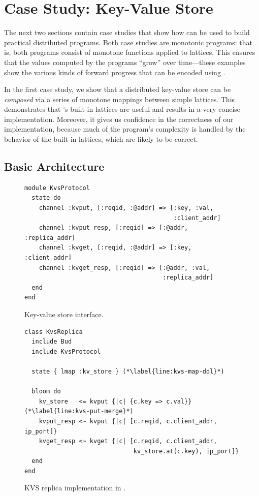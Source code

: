 \section{Case Study: Key-Value Store}
\label{sec:kvs}
The next two sections contain case studies that show how \lang can be used to
build practical distributed programs. Both case studies are monotonic programs:
that is, both programs consist of monotone functions applied to lattices. This
ensures that the values computed by the programs ``grow'' over time---these
examples show the various kinds of forward progress that can be encoded using
\lang.

In the first case study, we show that a distributed key-value store can be
\emph{composed} via a series of monotone mappings between simple lattices. This
demonstrates that \lang's built-in lattices are useful and results in a very
concise implementation. Moreover, it gives us confidence in the correctness of
our implementation, because much of the program's complexity is handled by the
behavior of the built-in lattices, which are likely to be correct.

\subsection{Basic Architecture}
\begin{figure}[t]
\begin{scriptsize}
\begin{lstlisting}
module KvsProtocol
  state do
    channel :kvput, [:reqid, :@addr] => [:key, :val,
                                         :client_addr]
    channel :kvput_resp, [:reqid] => [:@addr, :replica_addr]
    channel :kvget, [:reqid, :@addr] => [:key, :client_addr]
    channel :kvget_resp, [:reqid] => [:@addr, :val,
                                      :replica_addr]
  end
end
\end{lstlisting}
\end{scriptsize}
\caption{Key-value store interface.}
\label{fig:kvs-interface}
\end{figure}

\begin{figure}[t]
\begin{scriptsize}
\begin{lstlisting}
class KvsReplica
  include Bud
  include KvsProtocol

  state { lmap :kv_store } (*\label{line:kvs-map-ddl}*)

  bloom do
    kv_store   <= kvput {|c| {c.key => c.val}} (*\label{line:kvs-put-merge}*)
    kvput_resp <~ kvput {|c| [c.reqid, c.client_addr, ip_port]}
    kvget_resp <~ kvget {|c| [c.reqid, c.client_addr,
                              kv_store.at(c.key), ip_port]}
  end
end
\end{lstlisting}
\end{scriptsize}
\caption{KVS replica implementation in \lang.}
\label{fig:kvs-replica}
\end{figure}

